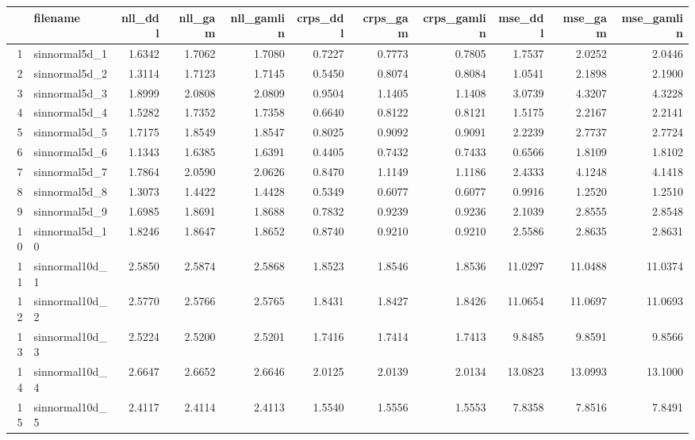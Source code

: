 \begin{table}[ht]
\centering
\begin{tabular}{rlrrrrrrrrr}
  \hline
 & filename & nll\_ddl & nll\_gam & nll\_gamlin & crps\_ddl & crps\_gam & crps\_gamlin & mse\_ddl & mse\_gam & mse\_gamlin \\ 
  \hline
1 & sinnormal5d\_1 & 1.6342 & 1.7062 & 1.7080 & 0.7227 & 0.7773 & 0.7805 & 1.7537 & 2.0252 & 2.0446 \\ 
  2 & sinnormal5d\_2 & 1.3114 & 1.7123 & 1.7145 & 0.5450 & 0.8074 & 0.8084 & 1.0541 & 2.1898 & 2.1900 \\ 
  3 & sinnormal5d\_3 & 1.8999 & 2.0808 & 2.0809 & 0.9504 & 1.1405 & 1.1408 & 3.0739 & 4.3207 & 4.3228 \\ 
  4 & sinnormal5d\_4 & 1.5282 & 1.7352 & 1.7358 & 0.6640 & 0.8122 & 0.8121 & 1.5175 & 2.2167 & 2.2141 \\ 
  5 & sinnormal5d\_5 & 1.7175 & 1.8549 & 1.8547 & 0.8025 & 0.9092 & 0.9091 & 2.2239 & 2.7737 & 2.7724 \\ 
  6 & sinnormal5d\_6 & 1.1343 & 1.6385 & 1.6391 & 0.4405 & 0.7432 & 0.7433 & 0.6566 & 1.8109 & 1.8102 \\ 
  7 & sinnormal5d\_7 & 1.7864 & 2.0590 & 2.0626 & 0.8470 & 1.1149 & 1.1186 & 2.4333 & 4.1248 & 4.1418 \\ 
  8 & sinnormal5d\_8 & 1.3073 & 1.4422 & 1.4428 & 0.5349 & 0.6077 & 0.6077 & 0.9916 & 1.2520 & 1.2510 \\ 
  9 & sinnormal5d\_9 & 1.6985 & 1.8691 & 1.8688 & 0.7832 & 0.9239 & 0.9236 & 2.1039 & 2.8555 & 2.8548 \\ 
  10 & sinnormal5d\_10 & 1.8246 & 1.8647 & 1.8652 & 0.8740 & 0.9210 & 0.9210 & 2.5586 & 2.8635 & 2.8631 \\ 
  11 & sinnormal10d\_1 & 2.5850 & 2.5874 & 2.5868 & 1.8523 & 1.8546 & 1.8536 & 11.0297 & 11.0488 & 11.0374 \\ 
  12 & sinnormal10d\_2 & 2.5770 & 2.5766 & 2.5765 & 1.8431 & 1.8427 & 1.8426 & 11.0654 & 11.0697 & 11.0693 \\ 
  13 & sinnormal10d\_3 & 2.5224 & 2.5200 & 2.5201 & 1.7416 & 1.7414 & 1.7413 & 9.8485 & 9.8591 & 9.8566 \\ 
  14 & sinnormal10d\_4 & 2.6647 & 2.6652 & 2.6646 & 2.0125 & 2.0139 & 2.0134 & 13.0823 & 13.0993 & 13.1000 \\ 
  15 & sinnormal10d\_5 & 2.4117 & 2.4114 & 2.4113 & 1.5540 & 1.5556 & 1.5553 & 7.8358 & 7.8516 & 7.8491 \\ 

\end{tabular}
\end{table}
